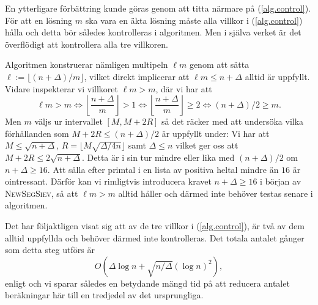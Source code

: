 En ytterligare förbättring kunde göras genom att titta närmare på (\ref{alg.control}).
För att en lösning $m$ ska vara en äkta lösning måste alla villkor i (\ref{alg.control}) hålla
och detta bör således kontrolleras i algoritmen.
Men i själva verket är det överflödigt att kontrollera alla tre villkoren.

Algoritmen konstruerar nämligen multipeln $\ell m$ genom att sätta $\ell:=\lfloor (n+\Delta)/m \rfloor$,
vilket direkt implicerar att $\ell m \leq n+\Delta$ alltid är uppfyllt.
Vidare inspekterar vi villkoret $\ell m>m$, där vi har att
\begin{equation*}
    \ell m>m \iff
    \left\lfloor \frac{n+\Delta}{m} \right\rfloor > 1 \iff
    \left\lfloor \frac{n+\Delta}{m} \right\rfloor \geq 2 \iff
    (n+\Delta)/2\geq m.
\end{equation*}
Men $m$ väljs ur intervallet $[M,M+2R]$ så det räcker med att undersöka vilka förhållanden som  $M+2R\leq(n+\Delta)/2$ är uppfyllt under:
Vi har att $M\leq\sqrt{n+\Delta}$, $R=\lfloor M\sqrt{\Delta/4n}\rfloor$ samt $\Delta\leq n$ vilket ger oss att $M+2R \leq 2\sqrt{n+\Delta}$.
Detta är i sin tur mindre eller lika med $(n+\Delta)/2$ om $n+\Delta\geq16$.
Att sålla efter primtal i en lista av positiva heltal mindre än $16$ är ointressant.
Därför kan vi rimligtvis introducera kravet $n+\Delta\geq16$ i början av \textsc{NewSegSiev},
så att $\ell m>m$ alltid håller och därmed inte behöver testas senare i algoritmen.

Det har följaktligen visat sig att av de tre villkor i (\ref{alg.control}),
är två av dem alltid uppfyllda och behöver därmed inte kontrolleras.
Det totala antalet gånger som detta steg utförs är
\begin{equation*}
    O\left(\Delta\log n + \sqrt{n/\Delta}(\log n)^2\right),
\end{equation*}
enligt \cite[s.346]{HaraldSieve} och vi sparar således en betydande mängd tid på att reducera antalet beräkningar här till en tredjedel av det ursprungliga.


